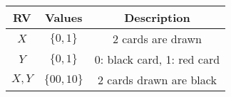 
\begin{center}
\begin{tabular}{|c|c|c|}
\hline
\textbf{RV}& \textbf{Values} & \textbf{Description} \\ \hline
$X$		   & 	$\{0,1\}$	&  2 cards are drawn\\ \hline
$Y$ 		   & 	$\{0,1\}$	&	0: black card, 1: red card\\ \hline
$X,Y$ 		   & 	$\{00,10\}$	&	2 cards drawn are black\\ \hline
\end{tabular}
\end{center}
